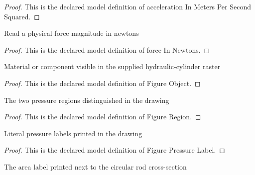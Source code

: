 \begin{proof}
  This is the declared model definition of acceleration In Meters Per Second Squared.
\end{proof}
\begin{definition}
  \label{def:physics:phyx-mini-0381:phyxminiproblems-problemphyxmini0381-forceinnewtons}
  Read a physical force magnitude in newtons
\end{definition}
\begin{proof}
  This is the declared model definition of force In Newtons.
\end{proof}
\begin{definition}
  \label{def:physics:phyx-mini-0381:phyxminiproblems-problemphyxmini0381-figureobject}
  Material or component visible in the supplied hydraulic-cylinder raster
\end{definition}
\begin{proof}
  This is the declared model definition of Figure Object.
\end{proof}
\begin{definition}
  \label{def:physics:phyx-mini-0381:phyxminiproblems-problemphyxmini0381-figureregion}
  The two pressure regions distinguished in the drawing
\end{definition}
\begin{proof}
  This is the declared model definition of Figure Region.
\end{proof}
\begin{definition}
  \label{def:physics:phyx-mini-0381:phyxminiproblems-problemphyxmini0381-figurepressurelabel}
  Literal pressure labels printed in the drawing
\end{definition}
\begin{proof}
  This is the declared model definition of Figure Pressure Label.
\end{proof}
\begin{definition}
  \label{def:physics:phyx-mini-0381:phyxminiproblems-problemphyxmini0381-figurearealabel}
  The area label printed next to the circular rod cross-section
\end{definition}
